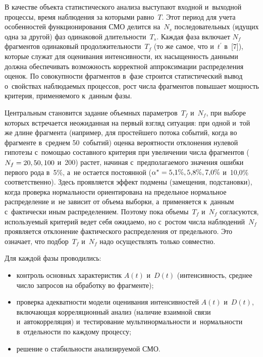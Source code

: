 \begin{multicols}{2}
     В качестве объекта статистического анализа выступают входной и~выходной 
процессы, время наблюдения за которыми равно~$T$. Этот период для учета 
особенностей функционирования СМО делится на~$N_s$ последовательных 
(идущих одна за другой) фаз одинаковой дли\-тель\-ности~$T_s$. Каждая фаза 
включает $N_f$  фрагментов одинаковый продолжительности~$T_f$ (то же самое, что 
и~$t^\prime$ в~[7]), которые служат для оценивания интенсивности, их 
насыщенность данными должна обеспечивать воз\-мож\-ность корректной 
аппроксимации распределения оценок. По со\-во\-куп\-ности фрагментов в~фазе 
строится статистический вывод о~свойствах наблю\-да\-емых процессов, рост числа 
фрагментов повышает мощ\-ность критерия, при\-ме\-ня\-емо\-го к~данным фазы. 
     
     Центральным становится задание объемных параметров~$T_f$ и~$N_f$, 
при выборе которых встречается неожиданная на первый взгляд ситуация: при 
одной и~той же длине фрагмента (например, для прос\-тей\-ше\-го потока событий, 
когда во фрагменте в~среднем 50~событий) оценка ве\-ро\-ят\-ности отклонения 
нулевой гипотезы 
 с~пом\-ощью составного критерия при увеличении числа фрагментов ($N_f\hm= 
20, 50, 100$ и~200) растет, начиная с~пред\-по\-ла\-га\-емо\-го значения ошиб\-ки первого 
рода в~5\%, а~не остается постоянной ($\alpha^*\hm= 5{,}1\%, 5{,}8\%, 7{,}0\%$ 
и~10{,}0\% соответственно). Здесь проявляется эффект подмены (замещения, 
подстановки), когда проверка нор\-маль\-ности ориентирована на предельное 
нормальное распределение и~не зависит от объема выборки, а~применяется 
к~данным с~фактически иным распределением. Поэтому пока объемы~$T_f$ 
и~$N_f$ со\-гла\-су\-ют\-ся, ис\-поль\-зу\-емый критерий ведет себя ожидаемо, но с~рос\-том 
чис\-ла наблюдений~$N_f$ проявляется отклонение фактического распределения от 
предельного. Это означает, что подбор~$T_f$ и~$N_f$ надо осуществлять только 
со\-вместно.
     
     Для каждой фазы проводились:
     \begin{itemize}
\item контроль основных характеристик $A(t)$ и~$D(t)$ (ин\-тен\-сив\-ность, среднее 
чис\-ло запросов на обработку во фрагменте); 
\item проверка адекватности модели оценивания интенсивностей $A(t)$ и~$D(t)$, 
включающая корреляционный анализ (наличие взаимной связи и~автокорреляция) 
и~тестирование муль\-ти\-нор\-маль\-ности и~нор\-маль\-ности в~от\-дель\-ности по каж\-до\-му 
процессу; 
\item решение о стабильности ана\-ли\-зи\-ру\-емой СМО.
\end{itemize}



\end{multicols}
